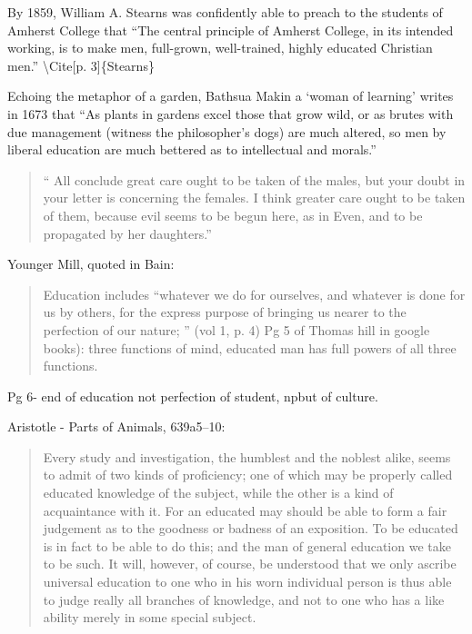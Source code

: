 By 1859, William A. Stearns was confidently able to preach to the students of Amherst College that ``The central principle of Amherst College, in its intended working, is to make men, full-grown, well-trained, highly educated Christian men.'' \textbackslash{}Cite[p. 3]\{Stearns\}

Echoing the metaphor of a garden, Bathsua Makin a `woman of learning' writes in 1673 that ``As plants in gardens excel those that grow wild, or as brutes with due management (witness the philosopher's dogs) are much altered, so men by liberal education are much bettered as to intellectual and morals.''

\begin{quote}

`` All conclude great care ought to be taken of the males, but your doubt in your letter is concerning the females. I think greater care ought to be taken of them, because evil seems to be begun here, as in Even, and to be propagated by her daughters.''
\end{quote}

Younger Mill, quoted in Bain: 

\begin{quote}

Education includes ``whatever we do for ourselves, and whatever is done for us by others, for the express purpose of bringing us nearer to the perfection of our nature; '' (vol 1, p. 4)
Pg 5 of Thomas hill in google books): three functions of mind, educated man has full powers of all three functions.
\end{quote}

Pg 6- end of education not perfection of student, npbut of culture.

Aristotle - Parts of Animals, 639a5--10:

\begin{quote}

Every study and investigation, the humblest and the noblest alike, seems to admit of two kinds of proficiency; one of which may be properly called educated knowledge of the subject, while the other is a kind of acquaintance with it. For an educated may should be able to form a fair judgement as to the goodness or badness of an exposition. To be educated is in fact to be able to do this; and the man of general education we take to be such. It will, however, of course, be understood that we only ascribe universal education to one who in his worn individual person is thus able to judge really all branches of knowledge, and not to one who has a like ability merely in some special subject.
\end{quote}

